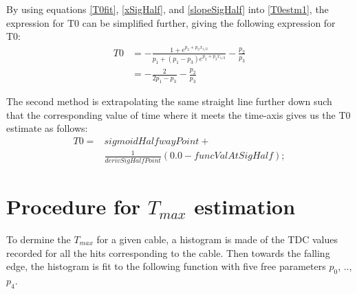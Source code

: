 \documentclass[12pt,epsfig]{article}
\def\tmax{$T_{max}$ }
\begin{document}
By using equations \ref{T0fit}, \ref{xSigHalf}, and \ref{slopeSigHalf} into \ref{T0estm1}, the expression for T0 can be simplified further, giving
the following expression for T0:
\begin{equation}
\label{T0estm2}
\begin{aligned}
  T0   & = - \frac{1 + e^{p_2 + p_3 x_{1/2}}}{p_1 + (p_1 - p_3) e^{p_2 + p_3 x_{1/2}}} - \frac{p_2}{p_3}\\
       & = - \frac{2}{2p_1  - p_3} - \frac{p_2}{p_3}
\end{aligned}
\end{equation}


The second method is extrapolating the same straight line further down such that the corresponding value of
time where it meets the time-axis gives us the T0 estimate as follows:
\begin{equation}
\label{T0estm2n}
\begin{aligned}
   T0  =    &  sigmoidHalfwayPoint + \\
            & \frac{1}{derivSigHalfPoint} (0.0 - funcValAtSigHalf);
\end{aligned}
\end{equation}

\section{Procedure for \tmax estimation}
To dermine the \tmax for a given cable, a histogram is made of the TDC values recorded for all the hits corresponding to the cable. Then towards the falling edge, the histogram is fit to the following function with five free parameters $p_0$, .., $p_4$.
\end{document}
